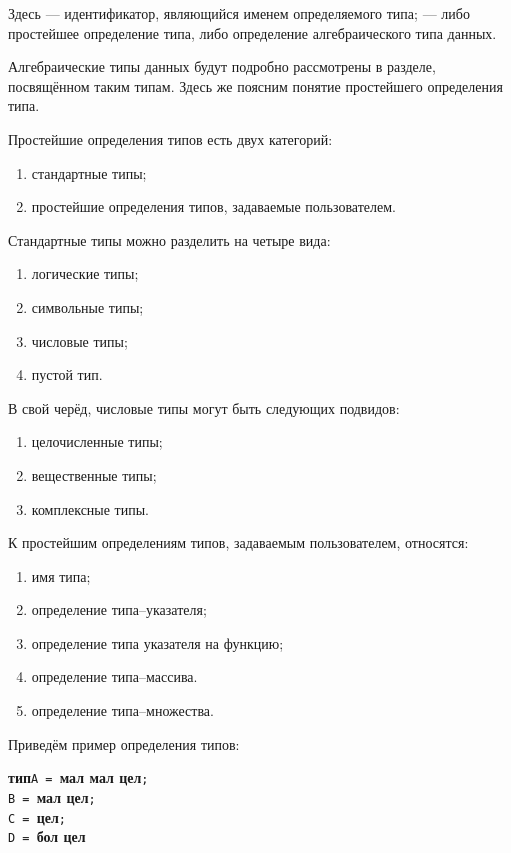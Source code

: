 \documentclass[10pt]{report}
\begin{document}
Здесь \textcolor{Green}{} --- идентификатор, являющийся именем определяемого типа; \textcolor{Green}{} --- либо
простейшее определение типа, либо определение алгебраического типа данных.

Алгебраические типы данных будут подробно рассмотрены в разделе, посвящённом таким типам. Здесь же поясним понятие простейшего определения типа.

Простейшие определения типов есть двух категорий:
\begin{enumerate}
    \item стандартные типы;
    \item простейшие определения типов, задаваемые пользователем.
\end{enumerate}

Стандартные типы можно разделить на четыре вида:
\begin{enumerate}
    \item логические типы;
    \item символьные типы;
    \item числовые типы;
    \item пустой тип.
\end{enumerate}

В свой черёд, числовые типы могут быть следующих подвидов:
\begin{enumerate}
    \item целочисленные типы;
    \item вещественные типы;
    \item комплексные типы.
\end{enumerate}

К простейшим определениям типов, задаваемым пользователем, относятся:
\begin{enumerate}
    \item имя типа;
    \item определение типа--указателя;
    \item определение типа указателя на функцию;
    \item определение типа--массива.
    \item определение типа--множества.
\end{enumerate}

Приведём пример определения типов:

\noindent\textbf{тип}\phantom{m}\texttt{A = }\textbf{мал мал цел}\texttt{;}\\
\phantom{типm}\texttt{B = }\textbf{мал цел}\texttt{;}\\
\phantom{типm}\texttt{C = }\textbf{цел}\texttt{;}\\
\phantom{типm}\texttt{D = }\textbf{бол цел}
\end{document}
